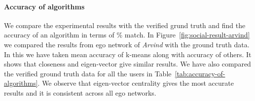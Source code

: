 \paragraph{Accuracy of algorithms}
We compare the experimental results with the verified grund truth
and find the accuracy of an algorithm in terms of \% match.  In
Figure~\ref{fig:social-result-arvind} we compared the results from ego
network of \emph{Arvind} with the ground truth data.  In this we have
taken mean accuracy of k-means along with accuracy of others. It shows
that closeness and eigen-vector give similar results.  We have also
compared the verified ground truth data for all the users in
Table~\ref{tab:accuracy-of-algorithms}.  We observe that eigen-vector
centrality gives the most accurate results and it is consistent across
all ego networks.


